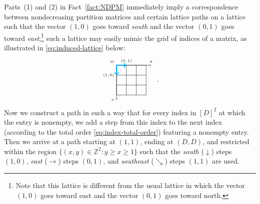 \documentclass[12pt,reqno]{amsart}
\numberwithin{equation}{section}
\theoremstyle{theorem}
\theoremstyle{definition}
\theoremstyle{named}
\begin{document}
Parts~(1) and (2) in Fact~\ref{fact:NDPM} immediately imply a correspondence between nondecreasing partition matrices and certain lattice paths on a lattice such that the vector $(1,0)$ goes toward \emph{south} and the vector $(0,1)$ goes toward \emph{east};\footnote{Note that this lattice is different from the usual lattice in which the vector $(1,0)$ goes toward east and the vector $(0,1)$ goes toward north.} such a lattice may easily mimic the grid of indices of a matrix, as illustrated in \eqref{eq:induced-lattice} below:
\begin{align}\label{eq:induced-lattice}
	\vcenter{\hbox{\begin{tikzpicture}[scale=0.5]
				\draw (1,1) grid (4,4);
				\draw[->] (1,4) -- (4.5,4);
				\draw[->] (1,4) -- (1,0.5);
				\node[above left] at (1,4) {\tiny $O$};
				\node[above] at (4.5,4) {\tiny $y$};
				\node[left] at (1,0.5) {\tiny $x$};
				\draw[line width=1.5pt,draw=cyan,->] (1,4) -- (2,4);
				\draw[line width=1.5pt,draw=cyan,->] (1,4) -- (1,3);
				\node[above] at (2,4) {\tiny $(0,1)$};
				\node[left] at (1,3) {\tiny $(1,0)$};
	\end{tikzpicture}}}\,\,.
\end{align}
Now we construct a path in such a way that for every index in $[D]^2$ at which the entry is nonempty, we add a step from this index to the next index (according to the total order \eqref{eq:index-total-order}) featuring a nonempty entry. Then we arrive at a path starting at $(1,1)$, ending at $(D,D)$, and restricted within the region $\{(x,y)\in \mathbb{Z}^2: y \ge x \ge 1\}$ such that the \emph{south} ($\downarrow$) steps $(1,0)$, \emph{east} ($\rightarrow$) steps $(0,1)$, and \emph{southeast} ($\searrow$) steps $(1,1)$ are used.
\end{document}
